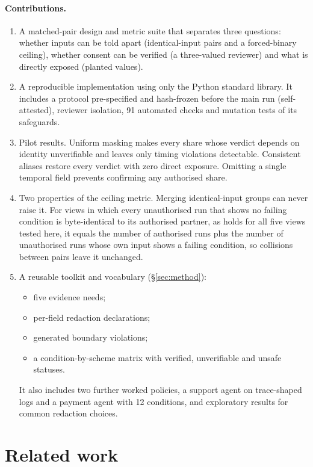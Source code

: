 \documentclass[11pt]{article}
\begin{document}
\paragraph{Contributions.}
\begin{enumerate}
  \item A matched-pair design and metric suite that separates three questions: whether inputs can be told apart (identical-input pairs and a forced-binary ceiling), whether consent can be verified (a three-valued reviewer) and what is directly exposed (planted values).
  \item A reproducible implementation using only the Python standard library. It includes a protocol pre-specified and hash-frozen before the main run (self-attested), reviewer isolation, 91 automated checks and mutation tests of its safeguards.
  \item Pilot results. Uniform masking makes every share whose verdict depends on identity unverifiable and leaves only timing violations detectable. Consistent aliases restore every verdict with zero direct exposure. Omitting a single temporal field prevents confirming any authorised share.
  \item Two properties of the ceiling metric. Merging identical-input groups can never raise it. For views in which every unauthorised run that shows no failing condition is byte-identical to its authorised partner, as holds for all five views tested here, it equals the number of authorised runs plus the number of unauthorised runs whose own input shows a failing condition, so collisions between pairs leave it unchanged.
  \item A reusable toolkit and vocabulary (\S\ref{sec:method}):
  \begin{itemize}
    \item five evidence needs;
    \item per-field redaction declarations;
    \item generated boundary violations;
    \item a condition-by-scheme matrix with verified, unverifiable and unsafe statuses.
  \end{itemize}
  It also includes two further worked policies, a support agent on trace-shaped logs and a payment agent with 12 conditions, and exploratory results for common redaction choices.
\end{enumerate}

\section{Related work}
\end{document}
